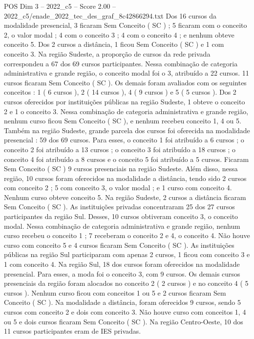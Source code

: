 \begin{textsample}{POS Dim 3 – 2022\_c5 – Score 2.00 – 2022\_c5/enade\_2022\_tec\_des\_graf\_8c42866294.txt}
Dos 16 cursos da modalidade presencial, 3 ficaram Sem Conceito ( SC ) ; 5 ficaram com o conceito 2, o valor modal ; 4 com o conceito 3 ; 4 com o conceito 4 ; e nenhum obteve conceito 5.
Dos 2 cursos a distância, 1 ficou Sem Conceito ( SC ) e 1 com conceito 3.
Na região Sudeste, a proporção de cursos da rede privada correspondeu a 67 dos 69 cursos participantes.
Nessa combinação de categoria administrativa e grande região, o conceito modal foi o 3, atribuído a 22 cursos. 11 cursos ficaram Sem Conceito ( SC ).
Os demais foram avaliados com os seguintes conceitos : 1 ( 6 cursos ), 2 ( 14 cursos ), 4 ( 9 cursos ) e 5 ( 5 cursos ).
Dos 2 cursos oferecidos por instituições públicas na região Sudeste, 1 obteve o conceito 2 e 1 o conceito 3.
Nessa combinação de categoria administrativa e grande região, nenhum curso ficou Sem Conceito ( SC ), e nenhum recebeu conceito 1, 4 ou 5.
Também na região Sudeste, grande parcela dos cursos foi oferecida na modalidade presencial : 59 dos 69 cursos.
Para esses, o conceito 1 foi atribuído a 6 cursos ; o conceito 2 foi atribuído a 13 cursos ; o conceito 3 foi atribuído a 18 cursos ; o conceito 4 foi atribuído a 8 cursos e o conceito 5 foi atribuído a 5 cursos.
Ficaram Sem Conceito ( SC ) 9 cursos presenciais na região Sudeste.
Além disso, nessa região, 10 cursos foram oferecidos na modalidade a distância, tendo sido 2 cursos com conceito 2 ; 5 com conceito 3, o valor modal ; e 1 curso com conceito 4.
Nenhum curso obteve conceito 5.
Na região Sudeste, 2 cursos a distância ficaram Sem Conceito ( SC ).
As instituições privadas concentraram 25 dos 27 cursos participantes da região Sul.
Desses, 10 cursos obtiveram conceito 3, o conceito modal.
Nessa combinação de categoria administrativa e grande região, nenhum curso recebeu o conceito 1 ; 7 receberam o conceito 2 e 4, o conceito 4.
Não houve curso com conceito 5 e 4 cursos ficaram Sem Conceito ( SC ).
As instituições públicas na região Sul participaram com apenas 2 cursos, 1 ficou com conceito 3 e 1 com conceito 4.
Na região Sul, 18 dos cursos foram oferecidos na modalidade presencial.
Para esses, a moda foi o conceito 3, com 9 cursos.
Os demais cursos presenciais da região foram alocados no conceito 2 ( 2 cursos ) e no conceito 4 ( 5 cursos ).
Nenhum curso ficou com conceitos 1 ou 5 e 2 cursos ficaram Sem Conceito ( SC ).
Na modalidade a distância, foram oferecidos 9 cursos, sendo 5 cursos com conceito 2 e dois com conceito 3.
Não houve curso com conceitos 1, 4 ou 5 e dois cursos ficaram Sem Conceito ( SC ).
Na região Centro-Oeste, 10 dos 11 cursos participantes eram de IES privadas.

\end{textsample}
